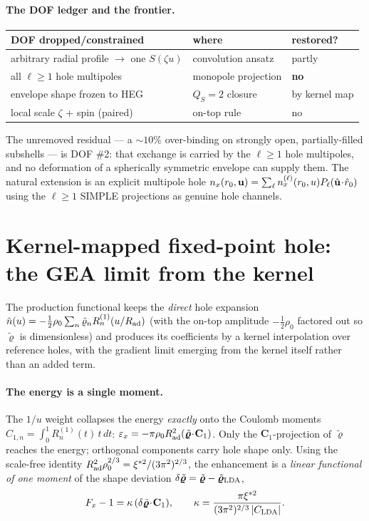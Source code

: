 \paragraph*{The DOF ledger and the frontier.}
\begin{center}
\renewcommand{\arraystretch}{1.2}
\begin{tabular}{p{}p{}p{}}
\toprule
DOF dropped/constrained & where & restored? \\
\midrule
arbitrary radial profile $\to$ one $S(\zeta u)$ & convolution ansatz & partly \\
all $\ell\ge1$ hole multipoles & monopole projection & \textbf{no} \\
envelope shape frozen to HEG & $Q_S=2$ closure & by kernel map \\
local scale $\zeta$ + spin (paired) & on-top rule & no \\
\bottomrule
\end{tabular}
\end{center}
The unremoved residual --- a $\sim10\%$ over-binding on strongly open,
partially-filled subshells --- is DOF \#2: that exchange is carried by the
$\ell\ge1$ hole multipoles, and no deformation of a spherically symmetric envelope
can supply them. The natural extension is an explicit multipole hole
$n_x(r_0,\mathbf{u})=\sum_\ell n_x^{(\ell)}(r_0,u)P_\ell(\hat{\mathbf{u}}\!\cdot\!\hat r_0)$ using the
$\ell\ge1$ SIMPLE projections as genuine hole channels.

\section{Kernel-mapped fixed-point hole: the GEA limit from the kernel}
\label{app:kernel}

The production functional keeps the \emph{direct} hole expansion
$\tilde n(u)=-\tfrac12\rho_0\sum_n\tilde\varrho_n R^{(1)}_n(u/R_{\mathrm{ad}})$ (with the on-top amplitude
$-\tfrac12\rho_0$ factored out so $\tilde{\bm\varrho}$ is dimensionless) and produces its coefficients
by a kernel interpolation over reference holes, with the gradient limit emerging from the kernel
itself rather than an added term.

\paragraph*{The energy is a single moment.} The $1/u$ weight collapses the energy \emph{exactly}
onto the Coulomb moments $C_{1,n}=\int_0^1 R^{(1)}_n(t)\,t\,dt$:
$\varepsilon_x=-\pi\rho_0R_{\mathrm{ad}}^2(\tilde{\bm\varrho}\!\cdot\!\mathbf C_1)$. Only the
$\mathbf C_1$-projection of $\tilde{\bm\varrho}$ reaches the energy; orthogonal components carry hole
shape only. Using the scale-free identity $R_{\mathrm{ad}}^2\rho_0^{2/3}=\xi^{*2}/(3\pi^2)^{2/3}$, the
enhancement is a \emph{linear functional of one moment} of the shape deviation
$\delta\tilde{\bm\varrho}=\tilde{\bm\varrho}-\tilde{\bm\varrho}_{\rm LDA}$,
\begin{equation}
F_x-1=\kappa\,(\delta\tilde{\bm\varrho}\!\cdot\!\mathbf C_1),\qquad
\kappa=\frac{\pi \xi^{*2}}{(3\pi^2)^{2/3}\,|C_{\rm LDA}|}.
\label{eq:Fk}
\end{equation}

